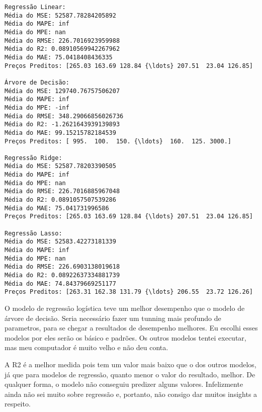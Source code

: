 \documentclass[11pt]{article}
\begin{document}
    \begin{Verbatim}[commandchars=\\\{\}]
Regressão Linear:
Média do MSE: 52587.78284205892
Média do MAPE: inf
Média do MPE: nan
Média do RMSE: 226.7016923959988
Média do R2: 0.08910569942267962
Média do MAE: 75.0418408436335
Preços Preditos: [265.03 163.69 128.84 {\ldots} 207.51  23.04 126.85]

Árvore de Decisão:
Média do MSE: 129740.76757506207
Média do MAPE: inf
Média do MPE: -inf
Média do RMSE: 348.29066856026736
Média do R2: -1.2621643939139893
Média do MAE: 99.15215782184539
Preços Preditos: [ 995.  100.  150. {\ldots}  160.  125. 3000.]

Regressão Ridge:
Média do MSE: 52587.78203390505
Média do MAPE: inf
Média do MPE: nan
Média do RMSE: 226.7016885967048
Média do R2: 0.0891057507539286
Média do MAE: 75.041731996586
Preços Preditos: [265.03 163.69 128.84 {\ldots} 207.51  23.04 126.85]

Regressão Lasso:
Média do MSE: 52583.42273181339
Média do MAPE: inf
Média do MPE: nan
Média do RMSE: 226.6903138019618
Média do R2: 0.08922637334881739
Média do MAE: 74.84379669251177
Preços Preditos: [263.31 162.38 131.79 {\ldots} 206.55  23.72 126.26]

    \end{Verbatim}

    O modelo de regressão logística teve um melhor desempenho que o modelo
de árvore de decisão. Seria necessário fazer um tunning mais profundo de
parametros, para se chegar a resultados de desempenho melhores. Eu
escolhi esses modelos por eles serão os básico e padrões. Os outros
modelos tentei executar, mas meu computador é muito velho e não deu
conta.

A R2 é a melhor medida pois tem um valor mais baixo que o dos outros
modelos, já que para modelos de regressão, quanto menor o valor do
resultado, melhor. De qualquer forma, o modelo não conseguiu predizer
alguns valores. Infelizmente ainda não sei muito sobre regressão e,
portanto, não consigo dar muitos insights a respeito.


    
    
    
\end{document}
